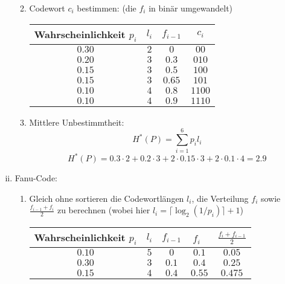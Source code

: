 \documentclass{scrreprt}
\begin{document}
\begin{uebsp}
\begin{Answer}
\begin{enumerate}[i)]
\begin{enumerate}[1)]
\begin{center}
\begin{tabular}{ccc}
                        \hline
                    \end{tabular}
                \end{center}
            \item Codewort $c_i$ bestimmen: (die $f_i$ in binär umgewandelt)
                 \begin{center}
                    \begin{tabular}{cccc}
                        \hline
                        Wahrscheinlichkeit $p_i$&$l_i$ & $f_{i-1}$ & $c_i$\\
                        \hline
                        $0.30$ & $2$ & $0$ & $00$\\
                        $0.20$ & $3$ & $0.3$ & $010$\\
                        $0.15$ & $3$ & $0.5$ & $100$\\
                        $0.15$ & $3$ & $0.65$ & $101$\\
                        $0.10$ & $4$ & $0.8$ & $1100$\\
                        $0.10$ & $4$ & $0.9$ & $1110$\\
                        \hline
                    \end{tabular}
                \end{center}                   
        \item Mittlere Unbestimmtheit:
            \[H^*(P)=\sum_{i=1}^6p_il_i\]
            \[H^*(P)=0.3\cdot 2+0.2\cdot 3+2\cdot 0.15\cdot 3+2\cdot 0.1\cdot 4=2.9\]
        \end{enumerate}
    \item Fanu-Code:
        \begin{enumerate}[1)]
            \item Gleich ohne sortieren die Codewortlängen $l_i$, die Verteilung $f_i$ sowie $\frac{f_{i-1}+f_i}{2}$ zu berechnen (wobei hier $l_i=\lceil\log_2(1/p_i)\rceil+1$)
                \begin{center}
                    \begin{tabular}{ccccc}
                        \hline
                        Wahrscheinlichkeit $p_i$&$l_i$ & $f_{i-1}$ & $f_{i}$\ & $\frac{f_i+f_{i-1}}{2}$\\
                        \hline
                        $0.10$ & $5$ & $0$ & $0.1$ & $0.05$\\
                        $0.30$ & $3$ & $0.1$ & $0.4$ & $0.25$\\
                        $0.15$ & $4$ & $0.4$ & $0.55$ & $0.475$\\

\end{tabular}
\end{center}
\end{enumerate}
\end{enumerate}
\end{Answer}
\end{uebsp}
\end{document}
